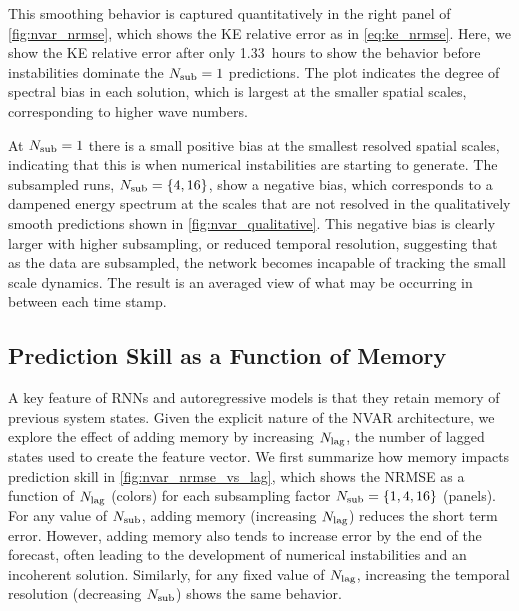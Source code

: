 \documentclass[draft]{agujournal2019}
\begin{document}
This smoothing behavior is captured quantitatively in the right panel of
\cref{fig:nvar_nrmse},
which shows the KE relative error as in \cref{eq:ke_nrmse}.
Here, we show the KE relative error after only 1.33~hours to show the behavior
before instabilities dominate the $N_\text{sub}=1$ predictions.
The plot indicates the degree of spectral bias in each solution, which is
largest at the smaller spatial scales, corresponding to higher wave numbers.

At $N_\text{sub}=1$ there is a small positive bias at the smallest resolved spatial
scales, indicating that this is when numerical instabilities are starting to
generate.
The subsampled runs, $N_\text{sub}=\{4,16\}$, show a negative bias, which corresponds
to a dampened energy spectrum at the scales that are not resolved in the
qualitatively smooth predictions shown in \cref{fig:nvar_qualitative}.
This negative bias is clearly larger with higher subsampling, or reduced
temporal resolution, suggesting that as the data are subsampled, the network
becomes incapable of tracking the small scale dynamics.
The result is an averaged view of what may be occurring in
between each time stamp.


\subsection{Prediction Skill as a Function of Memory}
\label{subsec:nvar-memory}

A key feature of RNNs and autoregressive models is that they retain memory of
previous system states.
Given the explicit nature of the NVAR architecture, we explore the effect of
adding memory by increasing $N_\text{lag}$, the number of lagged states used to create the
feature vector.
We first summarize how memory impacts prediction skill in
\cref{fig:nvar_nrmse_vs_lag}, which shows the NRMSE as a
function of $N_\text{lag}$ (colors) for each
subsampling factor $N_\text{sub} = \{1, 4, 16\}$ (panels).
For any value of $N_\text{sub}$, adding memory (increasing $N_\text{lag}$) reduces
the short term error.
However, adding memory also tends to increase error by the end of the forecast,
often leading to the development of numerical instabilities and an
incoherent solution.
Similarly, for any fixed value of $N_\text{lag}$, increasing the temporal resolution
(decreasing $N_\text{sub}$) shows the same behavior.
\end{document}
